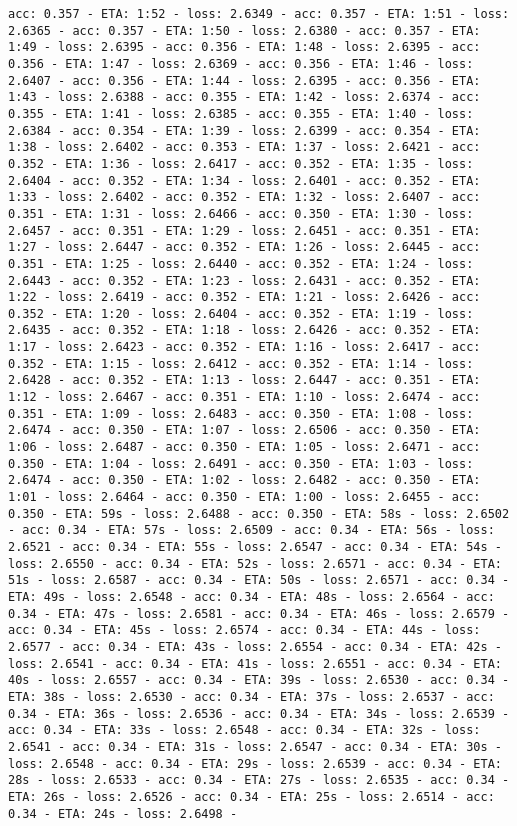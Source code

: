\documentclass[11pt]{article}
\begin{document}
\begin{Verbatim}[commandchars=\\\{\}]
acc: 0.357 - ETA: 1:52 - loss: 2.6349 - acc: 0.357 - ETA: 1:51 - loss: 2.6365 - acc: 0.357 - ETA: 1:50 - loss: 2.6380 - acc: 0.357 - ETA: 1:49 - loss: 2.6395 - acc: 0.356 - ETA: 1:48 - loss: 2.6395 - acc: 0.356 - ETA: 1:47 - loss: 2.6369 - acc: 0.356 - ETA: 1:46 - loss: 2.6407 - acc: 0.356 - ETA: 1:44 - loss: 2.6395 - acc: 0.356 - ETA: 1:43 - loss: 2.6388 - acc: 0.355 - ETA: 1:42 - loss: 2.6374 - acc: 0.355 - ETA: 1:41 - loss: 2.6385 - acc: 0.355 - ETA: 1:40 - loss: 2.6384 - acc: 0.354 - ETA: 1:39 - loss: 2.6399 - acc: 0.354 - ETA: 1:38 - loss: 2.6402 - acc: 0.353 - ETA: 1:37 - loss: 2.6421 - acc: 0.352 - ETA: 1:36 - loss: 2.6417 - acc: 0.352 - ETA: 1:35 - loss: 2.6404 - acc: 0.352 - ETA: 1:34 - loss: 2.6401 - acc: 0.352 - ETA: 1:33 - loss: 2.6402 - acc: 0.352 - ETA: 1:32 - loss: 2.6407 - acc: 0.351 - ETA: 1:31 - loss: 2.6466 - acc: 0.350 - ETA: 1:30 - loss: 2.6457 - acc: 0.351 - ETA: 1:29 - loss: 2.6451 - acc: 0.351 - ETA: 1:27 - loss: 2.6447 - acc: 0.352 - ETA: 1:26 - loss: 2.6445 - acc: 0.351 - ETA: 1:25 - loss: 2.6440 - acc: 0.352 - ETA: 1:24 - loss: 2.6443 - acc: 0.352 - ETA: 1:23 - loss: 2.6431 - acc: 0.352 - ETA: 1:22 - loss: 2.6419 - acc: 0.352 - ETA: 1:21 - loss: 2.6426 - acc: 0.352 - ETA: 1:20 - loss: 2.6404 - acc: 0.352 - ETA: 1:19 - loss: 2.6435 - acc: 0.352 - ETA: 1:18 - loss: 2.6426 - acc: 0.352 - ETA: 1:17 - loss: 2.6423 - acc: 0.352 - ETA: 1:16 - loss: 2.6417 - acc: 0.352 - ETA: 1:15 - loss: 2.6412 - acc: 0.352 - ETA: 1:14 - loss: 2.6428 - acc: 0.352 - ETA: 1:13 - loss: 2.6447 - acc: 0.351 - ETA: 1:12 - loss: 2.6467 - acc: 0.351 - ETA: 1:10 - loss: 2.6474 - acc: 0.351 - ETA: 1:09 - loss: 2.6483 - acc: 0.350 - ETA: 1:08 - loss: 2.6474 - acc: 0.350 - ETA: 1:07 - loss: 2.6506 - acc: 0.350 - ETA: 1:06 - loss: 2.6487 - acc: 0.350 - ETA: 1:05 - loss: 2.6471 - acc: 0.350 - ETA: 1:04 - loss: 2.6491 - acc: 0.350 - ETA: 1:03 - loss: 2.6474 - acc: 0.350 - ETA: 1:02 - loss: 2.6482 - acc: 0.350 - ETA: 1:01 - loss: 2.6464 - acc: 0.350 - ETA: 1:00 - loss: 2.6455 - acc: 0.350 - ETA: 59s - loss: 2.6488 - acc: 0.350 - ETA: 58s - loss: 2.6502 - acc: 0.34 - ETA: 57s - loss: 2.6509 - acc: 0.34 - ETA: 56s - loss: 2.6521 - acc: 0.34 - ETA: 55s - loss: 2.6547 - acc: 0.34 - ETA: 54s - loss: 2.6550 - acc: 0.34 - ETA: 52s - loss: 2.6571 - acc: 0.34 - ETA: 51s - loss: 2.6587 - acc: 0.34 - ETA: 50s - loss: 2.6571 - acc: 0.34 - ETA: 49s - loss: 2.6548 - acc: 0.34 - ETA: 48s - loss: 2.6564 - acc: 0.34 - ETA: 47s - loss: 2.6581 - acc: 0.34 - ETA: 46s - loss: 2.6579 - acc: 0.34 - ETA: 45s - loss: 2.6574 - acc: 0.34 - ETA: 44s - loss: 2.6577 - acc: 0.34 - ETA: 43s - loss: 2.6554 - acc: 0.34 - ETA: 42s - loss: 2.6541 - acc: 0.34 - ETA: 41s - loss: 2.6551 - acc: 0.34 - ETA: 40s - loss: 2.6557 - acc: 0.34 - ETA: 39s - loss: 2.6530 - acc: 0.34 - ETA: 38s - loss: 2.6530 - acc: 0.34 - ETA: 37s - loss: 2.6537 - acc: 0.34 - ETA: 36s - loss: 2.6536 - acc: 0.34 - ETA: 34s - loss: 2.6539 - acc: 0.34 - ETA: 33s - loss: 2.6548 - acc: 0.34 - ETA: 32s - loss: 2.6541 - acc: 0.34 - ETA: 31s - loss: 2.6547 - acc: 0.34 - ETA: 30s - loss: 2.6548 - acc: 0.34 - ETA: 29s - loss: 2.6539 - acc: 0.34 - ETA: 28s - loss: 2.6533 - acc: 0.34 - ETA: 27s - loss: 2.6535 - acc: 0.34 - ETA: 26s - loss: 2.6526 - acc: 0.34 - ETA: 25s - loss: 2.6514 - acc: 0.34 - ETA: 24s - loss: 2.6498 - 
\end{Verbatim}
\end{document}
